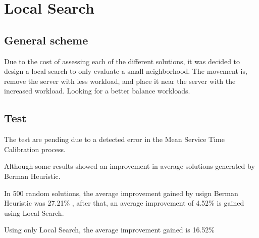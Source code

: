 \section{Local Search}
\subsection{General scheme}
\begin{frame}
  Due to the cost of assessing each of the different solutions, it was decided
  to design a local search to only evaluate a small neighborhood.
  The movement is, remove the server with less workload,
  and place it near the server with the increased workload.
  Looking for a better balance workloads.
\end{frame}
\subsection{Test}
\begin{frame}
  The test are pending due to a detected error in the Mean Service Time 
  Calibration process.

  Although some results showed an improvement in average solutions generated by
  Berman Heuristic.

  In 500 random solutions, the average improvement gained by usign Berman
  Heuristic was 27.21\% , after that, an average improvement of 4.52\% 
  is gained using Local Search.

  Using only Local Search, the average improvement gained is 16.52\%
\end{frame}
